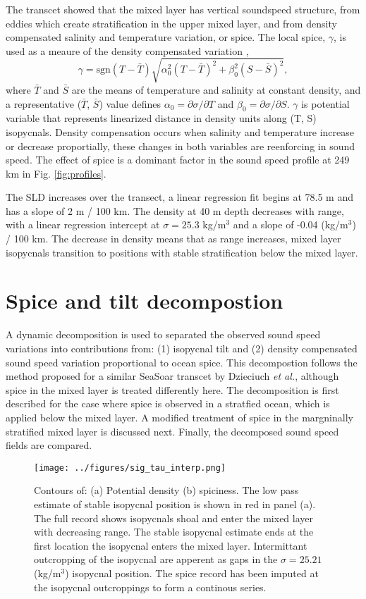 \documentclass[preprint,NumberedRefs]{JASA}
\begin{document}
The transcet showed that the mixed layer has vertical soundspeed structure, from eddies which create stratification in the upper mixed layer, and from density compensated salinity and temperature variation, or spice. The local spice, $\gamma$, is used as a meaure of the density compensated variation \citep{klymak2015spice},
\begin{equation}
    \gamma=\textrm{sgn}(T-\bar{T}) \sqrt{\alpha_0^2(T-\bar{T})^2 +\beta_0^2(S-\bar{S})^2},
    \label{eq:gamma}
\end{equation}
where $\bar{T}$ and $\bar{S}$ are the means of temperature and salinity at constant density, and a representative ($\bar{T}$, $\bar{S}$) value defines $\alpha_0=\partial \sigma / \partial T$ and $\beta_0=\partial \sigma / \partial S$. $\gamma$ is potential variable that represents linearized distance in density units along (T, S) isopycnals. Density compensation occurs when salinity and temperature increase or decrease proportially, these changes in both variables are reenforcing in sound speed. The effect of spice is a dominant factor in the sound speed profile at 249 km in Fig. \ref{fig:profiles}.

The SLD increases over the transect, a linear regression fit begins at 78.5 m and has a slope of 2 m / 100 km. The density at 40 m depth decreases with range, with a linear regression intercept at $\sigma=25.3$ kg/m$^3$ and a slope of -0.04 (kg/m$^3$) / 100 km. The decrease in density means that as range increases, mixed layer isopycnals transition to positions with stable stratification below the mixed layer.

\section{\label{sec:decomposition}Spice and tilt decompostion}
A dynamic decomposition is used to separated the observed sound speed variations into contributions from: (1) isopycnal tilt and (2) density compensated sound speed variation proportional to ocean spice. This decompostion follows the method proposed for a similar SeaSoar transcet by Dzieciuch \emph{et al.}\citep{dzieciuch2004}, although spice in the mixed layer is treated differently here. The decomposition is first described for the case where spice is observed in a stratfied ocean, which is applied below the mixed layer. A modified treatment of spice in the margninally stratified mixed layer is discussed next. Finally, the decomposed sound speed fields are compared.

\begin{figure}
\texttt{[image: ../figures/sig\_tau\_interp.png]}
    \caption{\label{fig:cntrs}{Contours of: (a) Potential density (b) spiciness. The low pass estimate of stable isopycnal position is shown in red in panel (a). The full record shows isopycnals shoal and enter the mixed layer with decreasing range. The stable isopycnal estimate ends at the first location the isopycnal enters the mixed layer. Intermittant outcropping of the isopycnal are apperent as gaps in the $\sigma=25.21$ (kg/m$^3$) isopycnal position. The spice record has been imputed at the isopycnal outcroppings to form a continous series.}}
\end{figure}
\end{document}
